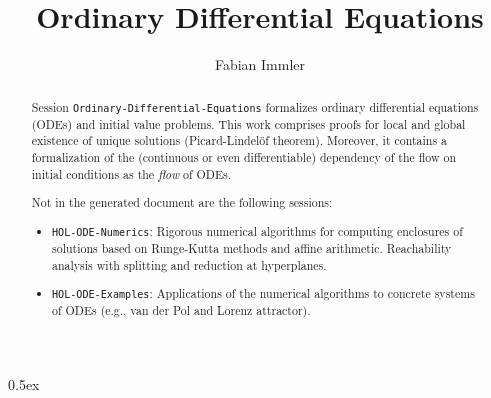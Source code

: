 \documentclass[11pt,a4paper]{article}
\title{Ordinary Differential Equations}
\author{Fabian Immler}
\begin{document}
\maketitle

\begin{abstract}

Session \texttt{Ordinary-Differential-Equations} formalizes ordinary differential equations (ODEs) and initial value
problems. This work comprises proofs for local and global existence of unique solutions
(Picard-Lindelöf theorem). Moreover, it contains a formalization of the (continuous or even
differentiable) dependency of the flow on initial conditions as the \emph{flow} of ODEs.

Not in the generated document are the following sessions:
\begin{itemize}
\item \texttt{HOL-ODE-Numerics}:
  Rigorous numerical algorithms for computing enclosures of solutions based on Runge-Kutta methods
  and affine arithmetic. Reachability analysis with splitting and reduction at hyperplanes.
\item \texttt{HOL-ODE-Examples}:
  Applications of the numerical algorithms to concrete systems of ODEs (e.g., van der Pol and Lorenz
    attractor).
\end{itemize}

\end{abstract}

\tableofcontents

\parindent 0pt\parskip 0.5ex





\end{document}
